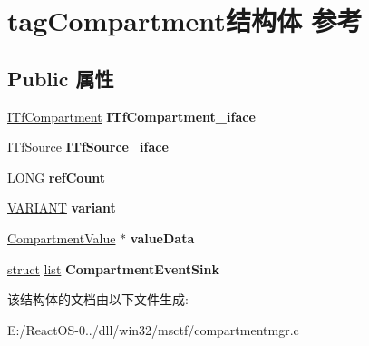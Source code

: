 \hypertarget{structtag_compartment}{}\section{tag\+Compartment结构体 参考}
\label{structtag_compartment}
\subsection*{Public 属性}
\begin{DoxyCompactItemize}
\item 
\mbox{\label{structtag_compartment_a163eb509c792142d9cf23d5e50a285e1}} 
\hyperlink{interface_i_tf_compartment}{I\+Tf\+Compartment} {\bfseries I\+Tf\+Compartment\+\_\+iface}
\item 
\mbox{\label{structtag_compartment_a1d2789ff07df0e41f0d5c960de37a58d}} 
\hyperlink{interface_i_tf_source}{I\+Tf\+Source} {\bfseries I\+Tf\+Source\+\_\+iface}
\item 
\mbox{\label{structtag_compartment_affa241dd7dc9c8e8b5825aceec555a20}} 
L\+O\+NG {\bfseries ref\+Count}
\item 
\mbox{\label{structtag_compartment_aded3b252843ecf8051e8c061cf677d65}} 
\hyperlink{structtag_v_a_r_i_a_n_t}{V\+A\+R\+I\+A\+NT} {\bfseries variant}
\item 
\mbox{\label{structtag_compartment_aa3d149208b426d6daa93ac04bc142011}} 
\hyperlink{structtag_compartment_value}{Compartment\+Value} $\ast$ {\bfseries value\+Data}
\item 
\mbox{\label{structtag_compartment_ab04c1fb1afc00b9b641fee456205311d}} 
\hyperlink{interfacestruct}{struct} \hyperlink{classlist}{list} {\bfseries Compartment\+Event\+Sink}
\end{DoxyCompactItemize}


该结构体的文档由以下文件生成\+:\begin{DoxyCompactItemize}
\item 
E\+:/\+React\+O\+S-\/0../dll/win32/msctf/compartmentmgr.\+c\end{DoxyCompactItemize}
